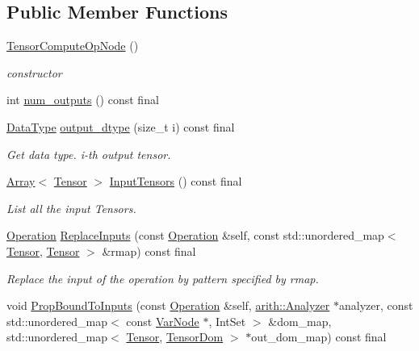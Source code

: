 \subsection*{Public Member Functions}
\begin{DoxyCompactItemize}
\item 
\hyperlink{classtvm_1_1te_1_1TensorComputeOpNode_a6448f522f6326aaed2d4137376c9fc78}{Tensor\+Compute\+Op\+Node} ()
\begin{DoxyCompactList}\small\item\em constructor \end{DoxyCompactList}\item 
int \hyperlink{classtvm_1_1te_1_1TensorComputeOpNode_afccdc3ad7b735d87f93dfecfc6f4021b}{num\+\_\+outputs} () const final
\item 
\hyperlink{namespacetvm_a41918af1a1dc386388639a9d3ad06c5d}{Data\+Type} \hyperlink{classtvm_1_1te_1_1TensorComputeOpNode_a36de23d9964e78fb0adc8c6e4c7efa7f}{output\+\_\+dtype} (size\+\_\+t i) const final
\begin{DoxyCompactList}\small\item\em Get data type. i-\/th output tensor. \end{DoxyCompactList}\item 
\hyperlink{classtvm_1_1Array}{Array}$<$ \hyperlink{classtvm_1_1te_1_1Tensor}{Tensor} $>$ \hyperlink{classtvm_1_1te_1_1TensorComputeOpNode_aa08974f313719690d7db3f0f89e8db2e}{Input\+Tensors} () const final
\begin{DoxyCompactList}\small\item\em List all the input Tensors. \end{DoxyCompactList}\item 
\hyperlink{classtvm_1_1te_1_1Operation}{Operation} \hyperlink{classtvm_1_1te_1_1TensorComputeOpNode_ad71a45eb73a872cd38e865e4800816db}{Replace\+Inputs} (const \hyperlink{classtvm_1_1te_1_1Operation}{Operation} \&self, const std\+::unordered\+\_\+map$<$ \hyperlink{classtvm_1_1te_1_1Tensor}{Tensor}, \hyperlink{classtvm_1_1te_1_1Tensor}{Tensor} $>$ \&rmap) const final
\begin{DoxyCompactList}\small\item\em Replace the input of the operation by pattern specified by rmap. \end{DoxyCompactList}\item 
void \hyperlink{classtvm_1_1te_1_1TensorComputeOpNode_ad24f571d7120ea926f77226b9773edcb}{Prop\+Bound\+To\+Inputs} (const \hyperlink{classtvm_1_1te_1_1Operation}{Operation} \&self, \hyperlink{classtvm_1_1arith_1_1Analyzer}{arith\+::\+Analyzer} $\ast$analyzer, const std\+::unordered\+\_\+map$<$ const \hyperlink{classtvm_1_1tir_1_1VarNode}{Var\+Node} $\ast$, Int\+Set $>$ \&dom\+\_\+map, std\+::unordered\+\_\+map$<$ \hyperlink{classtvm_1_1te_1_1Tensor}{Tensor}, \hyperlink{structtvm_1_1te_1_1TensorDom}{Tensor\+Dom} $>$ $\ast$out\+\_\+dom\+\_\+map) const final

\end{DoxyCompactItemize}
